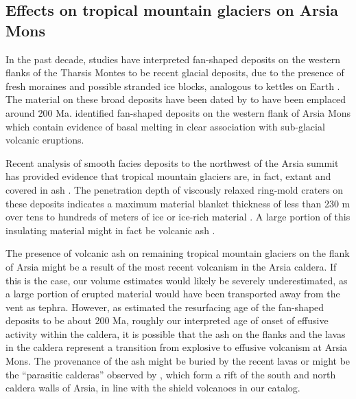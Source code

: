 \documentclass[12pt,letter]{article}
\begin{document}
\subsection{Effects on tropical mountain glaciers on Arsia Mons}

In the past decade, studies have interpreted fan-shaped deposits on the western flanks of the Tharsis Montes to be recent glacial deposits, due to the presence of fresh moraines and possible stranded ice blocks, analogous to kettles on Earth \citep{shean2007recent,kadish2014middle,scanlon2015remnant}. The material on these broad deposits have been dated by \citet{kadish2014middle} to have been emplaced around 200 Ma. \citet{scanlon2015volcanism} identified fan-shaped deposits on the western flank of Arsia Mons which contain evidence of basal melting in clear association with sub-glacial volcanic eruptions. 

Recent analysis of smooth facies deposits to the northwest of the Arsia summit has provided evidence that tropical mountain glaciers are, in fact, extant and covered in ash \citep{scanlon2015remnant}. The penetration depth of viscously relaxed ring-mold craters on these deposits indicates a maximum material blanket thickness of less than 230 m over tens to hundreds of meters of ice or ice-rich material \citep{head2014preservation}. A large portion of this insulating material might in fact be volcanic ash \citep{wilson1994mars,mouginis2002prodigious}.

The presence of volcanic ash on remaining tropical mountain glaciers on the flank of Arsia might be a result of the most recent volcanism in the Arsia caldera. If this is the case, our volume estimates would likely be severely underestimated, as a large portion of erupted material would have been transported away from the vent as tephra. However, as \citet{kadish2014middle} estimated the resurfacing age of the fan-shaped deposits to be about 200 Ma, roughly our interpreted age of onset of effusive activity within the caldera, it is possible that the ash on the flanks and the lavas in the caldera represent a transition from explosive to effusive volcanism at Arsia Mons. The provenance of the ash might be buried by the recent lavas or might be the ``parasitic calderas'' observed by \citet{crumpler1996calderas}, which form a rift of the south and north caldera walls of Arsia, in line with the shield volcanoes in our catalog.
\end{document}
